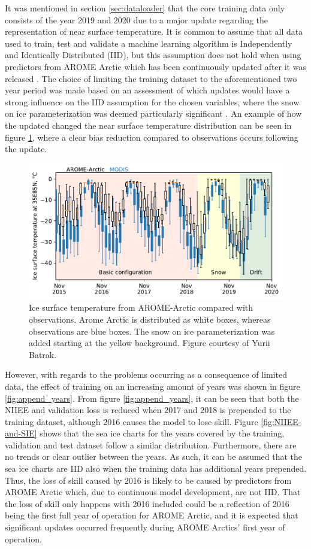 \documentclass[../main/thesis]{subfiles}
\begin{document}
It was mentioned in section \ref{sec:dataloader} that the core training data only consists of the year 2019 and 2020 due to a major update regarding the representation of near surface temperature. It is common to assume that all data used to train, test and validate a machine learning algorithm is Independently and Identically Distributed (IID), but this assumption does not hold when using predictors from AROME Arctic which has been continuously updated after it was released \citep{Mueller2017}. The choice of limiting the training dataset to the aforementioned two year period was made based on an assessment of which updates would have a strong influence on the IID assumption for the chosen variables, where the snow on ice parameterization was deemed particularly significant \citep{Batrak2019}. An example of how the updated changed the near surface temperature distribution can be seen in figure \ref{fig:aa-history}, where a clear bias reduction compared to observations occurs following the update.

\begin{figure}
    \centering
    \includegraphics[width=.9\textwidth]{aa-history}
    \caption{\label{fig:aa-history}Ice surface temperature from AROME-Arctic compared with observations. Arome Arctic is distributed as white boxes, whereas observations are blue boxes. The snow on ice parameterization was added starting at the yellow background. Figure courtesy of Yurii Batrak.}
\end{figure}

However, with regards to the problems occurring as a consequence of limited data, the effect of training on an increasing amount of years was shown in figure \ref{fig:append_years}. From figure \ref{fig:append_years}, it can be seen that both the NIIEE and validation loss is reduced when 2017 and 2018 is prepended to the training dataset, although 2016 causes the model to lose skill. Figure \ref{fig:NIIEE-and-SIE} shows that the sea ice charts for the years covered by the training, validation and test dataset follow a similar distribution. Furthermore, there are no trends or clear outlier between the years. As such, it can be assumed that the sea ice charts are IID also when the training data has additional years prepended. Thus, the loss of skill caused by 2016 is likely to be caused by predictors from AROME Arctic which, due to continuous model development, are not IID. That the loss of skill only happens with 2016 included could be a reflection of 2016 being the first full year of operation for AROME Arctic, and it is expected that significant updates occurred frequently during AROME Arctics' first year of operation.
\end{document}
